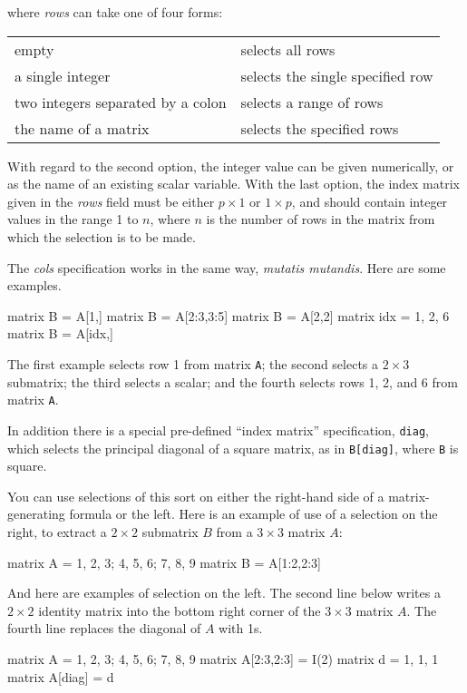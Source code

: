 where \textsl{rows} can take one of four forms:

\begin{center}
\begin{tabular}{ll}
empty & selects all rows \\
a single integer & selects the single specified row \\
two integers separated by a colon & selects a range of rows \\
the name of a matrix & selects the specified rows \\
\end{tabular}
\end{center}

With regard to the second option, the integer value can be given
numerically, or as the name of an existing scalar variable.  With the
last option, the index matrix given in the \textsl{rows} field must be
either $p\times 1$ or $1\times p$, and should contain integer values
in the range 1 to $n$, where $n$ is the number of rows in the matrix
from which the selection is to be made.

The \textsl{cols} specification works in the same way, \textit{mutatis
  mutandis}.  Here are some examples.
%
\begin{code}
matrix B = A[1,]
matrix B = A[2:3,3:5]
matrix B = A[2,2]
matrix idx = { 1, 2, 6 }
matrix B = A[idx,]
\end{code}
%
The first example selects row 1 from matrix \texttt{A}; the second
selects a $2\times 3$ submatrix; the third selects a scalar; and
the fourth selects rows 1, 2, and 6 from matrix \texttt{A}.

In addition there is a special pre-defined ``index matrix''
specification, \texttt{diag}, which selects the principal diagonal of
a square matrix, as in \texttt{B[diag]}, where \texttt{B} is square.

You can use selections of this sort on either the right-hand side of
a matrix-generating formula or the left.  Here is an example of use of
a selection on the right, to extract a $2\times 2$ submatrix $B$ from a
$3\times 3$ matrix $A$:
%
\begin{code}
matrix A = { 1, 2, 3; 4, 5, 6; 7, 8, 9 }
matrix B = A[1:2,2:3]
\end{code}
%
And here are examples of selection on the left.  The second line below
writes a $2\times 2$ identity matrix into the bottom right corner of the
$3\times 3$ matrix $A$.  The fourth line replaces the diagonal of $A$ 
with 1s.
%
\begin{code}
matrix A = { 1, 2, 3; 4, 5, 6; 7, 8, 9 }
matrix A[2:3,2:3] = I(2)
matrix d = { 1, 1, 1 }
matrix A[diag] = d
\end{code}

